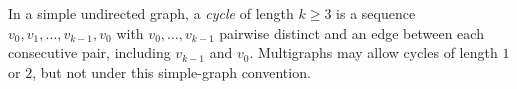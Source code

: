 
In a simple undirected graph, a \emph{cycle} of length $k\ge3$ is a sequence $v_0,v_1,\ldots,v_{k-1},v_0$ with $v_0,\ldots,v_{k-1}$ pairwise distinct and an edge between each consecutive pair, including $v_{k-1}$ and $v_0$. Multigraphs may allow cycles of length $1$ or $2$, but not under this simple-graph convention.
